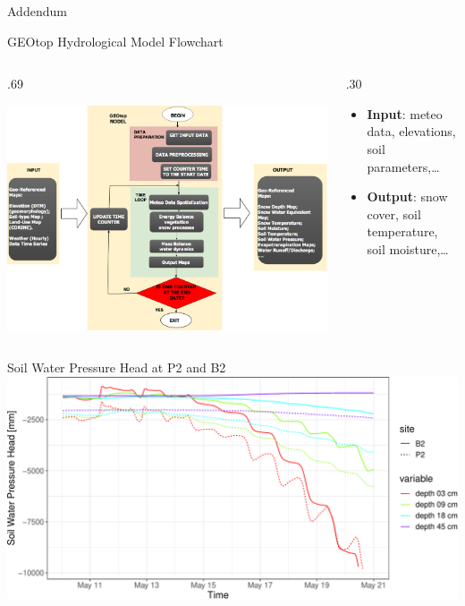 \documentclass[
  ignorenonframetext,
]{beamer}
\def\begincols{\begin{columns}}
\def\begincol{\begin{column}}
\def\endcol{\end{column}}
\def\endcols{\end{columns}}
\begin{document}
\begin{frame}{Addendum}
\protect\hypertarget{addendum}{}
\end{frame}

\begin{frame}{GEOtop Hydrological Model Flowchart}
\protect\hypertarget{geotop-hydrological-model-flowchart}{}
\begincols

\begincol{.69\textwidth}

\includegraphics[width=1\textwidth,height=\textheight]{resources/images/geotop_revised.png}\\
\endcol

\begincol{.30\textwidth}

\begin{itemize}
\item
  \textbf{Input}: meteo data, elevations, soil parameters,\ldots{}
\item
  \textbf{Output}: snow cover, soil temperature, soil moisture,\ldots{}
\end{itemize}

\endcol
\endcols
\end{frame}

\begin{frame}{Soil Water Pressure Head at P2 and B2}
\protect\hypertarget{soil-water-pressure-head-at-p2-and-b2}{}
\includegraphics{cordanoe_geotopbricks_presenetation_files/figure-beamer/unnamed-chunk-14-1.pdf}
\end{frame}
\end{document}
